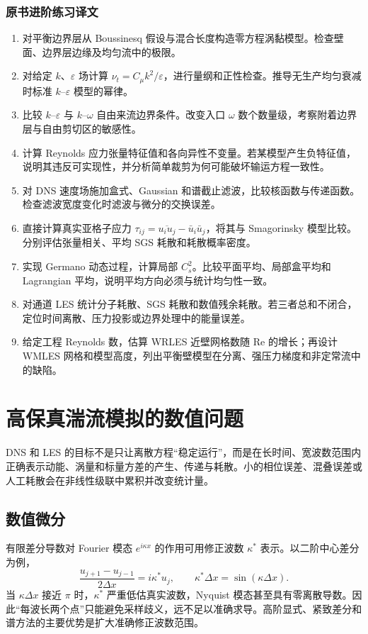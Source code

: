 \documentclass[12pt,a4paper,openany,fontset=none]{ctexbook}
\newcommand{\Rey}{\mathrm{Re}}
\begin{document}
\subsection*{原书进阶练习译文}
\begin{enumerate}[label=\arabic*.]
 \item 对平衡边界层从 Boussinesq 假设与混合长度构造零方程涡黏模型。检查壁面、边界层边缘及均匀流中的极限。
 \item 对给定 $k$、$\varepsilon$ 场计算 $\nu_t=C_\mu k^2/\varepsilon$，进行量纲和正性检查。推导无生产均匀衰减时标准 $k$--$\varepsilon$ 模型的幂律。
 \item 比较 $k$--$\varepsilon$ 与 $k$--$\omega$ 自由来流边界条件。改变入口 $\omega$ 数个数量级，考察附着边界层与自由剪切区的敏感性。
 \item 计算 Reynolds 应力张量特征值和各向异性不变量。若某模型产生负特征值，说明其违反可实现性，并分析简单裁剪为何可能破坏输运方程一致性。
 \item 对 DNS 速度场施加盒式、Gaussian 和谱截止滤波，比较核函数与传递函数。检查滤波宽度变化时滤波与微分的交换误差。
 \item 直接计算真实亚格子应力 $\tau_{ij}=\overline{u_iu_j}-\bar u_i\bar u_j$，将其与 Smagorinsky 模型比较。分别评估张量相关、平均 SGS 耗散和耗散概率密度。
 \item 实现 Germano 动态过程，计算局部 $C_s^2$。比较平面平均、局部盒平均和 Lagrangian 平均，说明平均方向必须与统计均匀性一致。
 \item 对通道 LES 统计分子耗散、SGS 耗散和数值残余耗散。若三者总和不闭合，定位时间离散、压力投影或边界处理中的能量误差。
 \item 给定工程 Reynolds 数，估算 WRLES 近壁网格数随 $\Rey$ 的增长；再设计 WMLES 网格和模型高度，列出平衡壁模型在分离、强压力梯度和非定常流中的缺陷。
\end{enumerate}
\chapter{高保真湍流模拟的数值问题}

DNS 和 LES 的目标不是只让离散方程“稳定运行”，而是在长时间、宽波数范围内正确表示动能、涡量和标量方差的产生、传递与耗散。小的相位误差、混叠误差或人工耗散会在非线性级联中累积并改变统计量。

\section{数值微分}

有限差分导数对 Fourier 模态 $e^{i\kappa x}$ 的作用可用修正波数 $\kappa^*$ 表示。以二阶中心差分为例，
\begin{equation}
 \frac{u_{j+1}-u_{j-1}}{2\Delta x}
 =i\kappa^*u_j,\qquad
 \kappa^*\Delta x=\sin(\kappa\Delta x).
\end{equation}
当 $\kappa\Delta x$ 接近 $\pi$ 时，$\kappa^*$ 严重低估真实波数，Nyquist 模态甚至具有零离散导数。因此“每波长两个点”只能避免采样歧义，远不足以准确求导。高阶显式、紧致差分和谱方法的主要优势是扩大准确修正波数范围。
\end{document}
